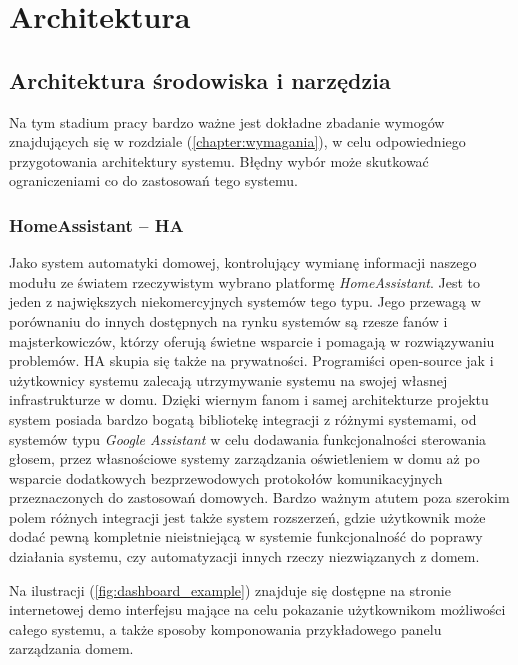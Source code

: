 
\chapter{Architektura}

\section{Architektura środowiska i narzędzia}
Na tym stadium pracy bardzo ważne jest dokładne zbadanie wymogów znajdujących się w rozdziale (\ref{chapter:wymagania}), w celu odpowiedniego przygotowania architektury systemu. Błędny wybór może skutkować ograniczeniami co do zastosowań tego systemu.

\subsection{HomeAssistant -- HA}
Jako system automatyki domowej, kontrolujący wymianę informacji naszego modułu ze światem rzeczywistym wybrano platformę \textit{HomeAssistant}. Jest to jeden z największych niekomercyjnych systemów tego typu. Jego przewagą w porównaniu do innych dostępnych na rynku systemów są rzesze fanów i majsterkowiczów, którzy oferują świetne wsparcie i pomagają w rozwiązywaniu problemów. HA skupia się także na prywatności. Programiści open-source jak i użytkownicy systemu zalecają utrzymywanie systemu na swojej własnej infrastrukturze w domu. Dzięki wiernym fanom i samej architekturze projektu system posiada bardzo bogatą bibliotekę integracji z różnymi systemami, od systemów typu \textit{Google Assistant} w celu dodawania funkcjonalności sterowania głosem, przez własnościowe systemy zarządzania oświetleniem w domu aż po wsparcie dodatkowych bezprzewodowych protokołów komunikacyjnych przeznaczonych do zastosowań domowych. Bardzo ważnym atutem poza szerokim polem różnych integracji jest także system rozszerzeń, gdzie użytkownik może dodać pewną kompletnie nieistniejącą w systemie funkcjonalność do poprawy działania systemu, czy automatyzacji innych rzeczy niezwiązanych z domem.

Na ilustracji (\ref{fig:dashboard_example}) znajduje się dostępne na stronie internetowej demo interfejsu mające na celu pokazanie użytkownikom możliwości całego systemu, a także sposoby komponowania przykładowego panelu zarządzania domem.

